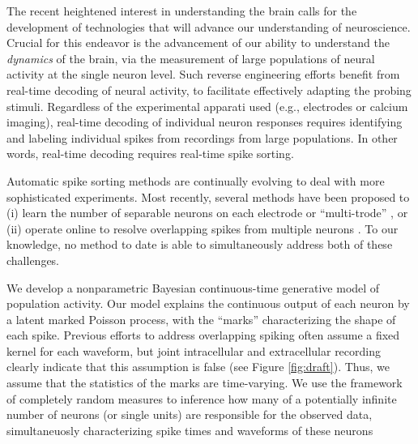 
The recent heightened interest in understanding the brain calls for the development of technologies that will advance our understanding of neuroscience. %
Crucial for this endeavor is the advancement of our ability to understand the \emph{dynamics} of the brain, via the measurement of large populations of 
neural activity at the single neuron level.  Such reverse engineering efforts  benefit from real-time decoding of neural activity, to 
facilitate effectively adapting the probing stimuli. 
Regardless of the experimental apparati used (e.g., electrodes or calcium imaging), real-time decoding of individual neuron responses requires identifying and labeling individual spikes from recordings from large populations.
In other words, real-time decoding requires real-time spike sorting.

Automatic spike sorting methods are continually evolving to deal with more sophisticated experiments.  Most recently, several methods have been proposed to (i) learn the number of separable neurons on each electrode or ``multi-trode'' \cite{??}, or (ii) operate online to resolve overlapping spikes from multiple neurons \cite{??}.   To our knowledge, no method to date is able to simultaneously address both of these challenges.  

We develop a nonparametric Bayesian continuous-time generative model of population activity.  Our model explains the continuous output of each neuron
by a latent marked Poisson process, with the ``marks'' characterizing the shape of each spike.  Previous efforts to address overlapping spiking often assume a fixed kernel for each waveform, but joint intracellular and extracellular recording clearly indicate that this assumption is false (see Figure \ref{fig:draft}). Thus, we assume that the statistics of the marks are time-varying.  
We use the framework of completely random measures to inference how many of a potentially infinite number of neurons (or single units)
are responsible for the observed data,  simultaneuosly characterizing spike times and waveforms of these neurons


